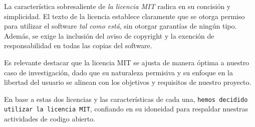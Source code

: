 La característica sobresaliente de \textit{la licencia MIT} radica en su concisión y simplicidad. El texto de la 
licencia establece claramente que se otorga permiso para utilizar el software \textit{tal como está}, sin otorgar 
garantías de ningún tipo. Además, se exige la inclusión del aviso de copyright y la exención de 
responsabilidad en todas las copias del software.

Es relevante destacar que la licencia MIT se ajusta de manera óptima a nuestro caso de investigación, dado 
que su naturaleza permisiva y su enfoque en la libertad del usuario se alinean con los objetivos y requisitos de 
nuestro proyecto. 

En base a estas dos licencias y las características de cada una, \texttt{hemos decidido utilizar la licencia MIT}, confiando en su idoneidad para respaldar nuestras actividades de codigo abierto.


